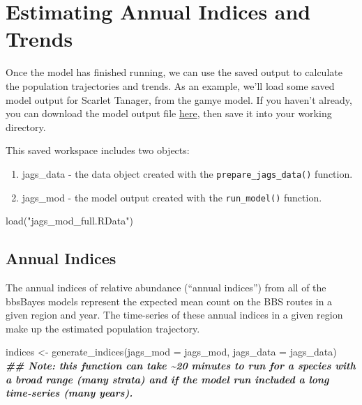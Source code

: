 \documentclass[
]{book}
\newenvironment{Shaded}{\begin{snugshade}}{\end{snugshade}}
\newcommand{\AttributeTok}[1]{\textcolor[rgb]{0.77,0.63,0.00}{#1}}
\newcommand{\DocumentationTok}[1]{\textcolor[rgb]{0.56,0.35,0.01}{\textbf{\textit{#1}}}}
\newcommand{\FunctionTok}[1]{\textcolor[rgb]{0.00,0.00,0.00}{#1}}
\newcommand{\NormalTok}[1]{#1}
\newcommand{\OtherTok}[1]{\textcolor[rgb]{0.56,0.35,0.01}{#1}}
\newcommand{\StringTok}[1]{\textcolor[rgb]{0.31,0.60,0.02}{#1}}
\begin{document}
\hypertarget{IndicesTrends}{%
\chapter{Estimating Annual Indices and Trends}\label{IndicesTrends}}

Once the model has finished running, we can use the saved output to calculate the population trajectories and trends. As an example, we'll load some saved model output for Scarlet Tanager, from the gamye model. If you haven't already, you can download the model output file \href{https://drive.google.com/file/d/1LCZrl0W0AEbXj8_MyUP-CXX3a-j77rFN/view?usp=sharing}{here}, then save it into your working directory.

This saved workspace includes two objects:

\begin{enumerate}
\def\labelenumi{\arabic{enumi}.}
\item
  jags\_data - the data object created with the \texttt{prepare\_jags\_data()} function.
\item
  jags\_mod - the model output created with the \texttt{run\_model()} function.
\end{enumerate}

\begin{Shaded}
\begin{Highlighting}[]
\FunctionTok{load}\NormalTok{(}\StringTok{"jags\_mod\_full.RData"}\NormalTok{)}
\end{Highlighting}
\end{Shaded}

\hypertarget{annual-indices}{%
\section{Annual Indices}\label{annual-indices}}

The annual indices of relative abundance (``annual indices'') from all of the bbsBayes models represent the expected mean count on the BBS routes in a given region and year. The time-series of these annual indices in a given region make up the estimated population trajectory.

\begin{Shaded}
\begin{Highlighting}[]
\NormalTok{indices }\OtherTok{\textless{}{-}} \FunctionTok{generate\_indices}\NormalTok{(}\AttributeTok{jags\_mod =}\NormalTok{ jags\_mod,}
                            \AttributeTok{jags\_data =}\NormalTok{ jags\_data)}
\DocumentationTok{\#\# Note: this function can take \textasciitilde{}20 minutes to run for a species with a broad range (many strata) and if the model run included a long time{-}series (many years).}
\end{Highlighting}
\end{Shaded}
\end{document}

